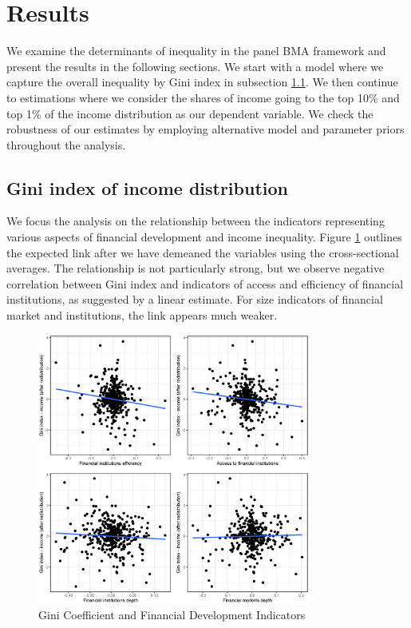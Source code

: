 \documentclass[preprint, nonatbib, 10pt]{elsarticle}
\begin{document}
\section{Results}
\label{ch4sec:results}
We examine the determinants of inequality in the panel \ac{BMA} framework and present the results in the following sections. We start with a model where we capture the overall inequality by Gini index in subsection \ref{ch4subsec:gini}. We then continue to estimations where we consider the shares of income going to the top 10\% and top 1\% of the income distribution as our dependent variable. We check the robustness of our estimates by employing alternative model and parameter priors throughout the analysis.

\subsection{Gini index of income distribution}\label{ch4subsec:gini}
We focus the analysis on the relationship between the indicators representing various aspects of financial development and income inequality. Figure \ref{ch4fig:gini_findev_dm} outlines the expected link after we have demeaned the variables using the cross-sectional averages. The relationship is not particularly strong, but we observe negative correlation between Gini index and indicators of access and efficiency of financial institutions, as suggested by a linear estimate. For size indicators of financial market and institutions, the link appears much weaker.

\begin{figure}[ht!]
  \centering
  \includegraphics[width=0.8\textwidth, keepaspectratio]{figures/plots_findev_gini_dm}
  \caption{Gini Coefficient and Financial Development Indicators}
  \label{ch4fig:gini_findev_dm}
\end{figure}
\end{document}

